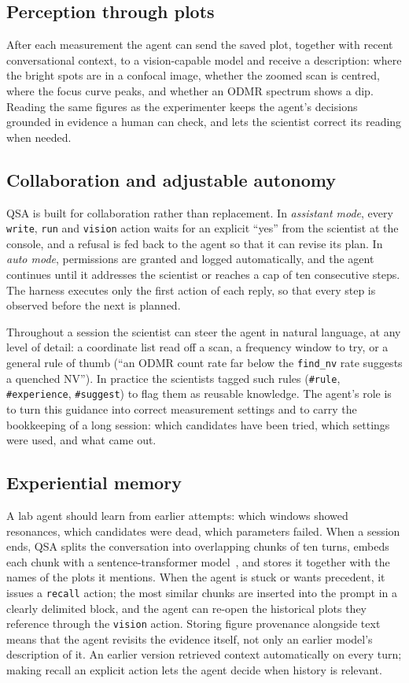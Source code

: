 \documentclass[10pt]{article}
\newcommand{\qsa}{QSA}
\newcommand{\code}[1]{\texttt{#1}}
\begin{document}
\subsection{Perception through plots}
After each measurement the agent can send the saved plot, together with recent conversational context, to a vision-capable model and receive a description: where the bright spots are in a confocal image, whether the zoomed scan is centred, where the focus curve peaks, and whether an ODMR spectrum shows a dip.
Reading the same figures as the experimenter keeps the agent's decisions grounded in evidence a human can check, and lets the scientist correct its reading when needed.

\subsection{Collaboration and adjustable autonomy}
\label{sec:modes}
\qsa{} is built for collaboration rather than replacement.
In \emph{assistant mode}, every \code{write}, \code{run} and \code{vision} action waits for an explicit ``yes'' from the scientist at the console, and a refusal is fed back to the agent so that it can revise its plan.
In \emph{auto mode}, permissions are granted and logged automatically, and the agent continues until it addresses the scientist or reaches a cap of ten consecutive steps.
The harness executes only the first action of each reply, so that every step is observed before the next is planned.

Throughout a session the scientist can steer the agent in natural language, at any level of detail: a coordinate list read off a scan, a frequency window to try, or a general rule of thumb (``an ODMR count rate far below the \code{find\_nv} rate suggests a quenched NV''). In practice the scientists tagged such rules (\code{\#rule}, \code{\#experience}, \code{\#suggest}) to flag them as reusable knowledge.
The agent's role is to turn this guidance into correct measurement settings and to carry the bookkeeping of a long session: which candidates have been tried, which settings were used, and what came out.

\subsection{Experiential memory}
\label{sec:memory}
A lab agent should learn from earlier attempts: which windows showed resonances, which candidates were dead, which parameters failed.
When a session ends, \qsa{} splits the conversation into overlapping chunks of ten turns, embeds each chunk with a sentence-transformer model~\cite{wang2020minilm}, and stores it together with the names of the plots it mentions.
When the agent is stuck or wants precedent, it issues a \code{recall} action; the most similar chunks are inserted into the prompt in a clearly delimited block, and the agent can re-open the historical plots they reference through the \code{vision} action.
Storing figure provenance alongside text means that the agent revisits the evidence itself, not only an earlier model's description of it.
An earlier version retrieved context automatically on every turn; making recall an explicit action lets the agent decide when history is relevant.
\end{document}
